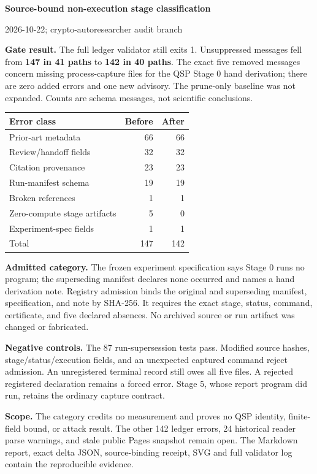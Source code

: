 \documentclass[10pt]{article}
\begin{document}
\begin{center}
{\Large\bfseries Source-bound non-execution stage classification}\par
{\small 2026-10-22; crypto-autoresearcher audit branch}
\end{center}

\textbf{Gate result.} The full ledger validator still exits 1. Unsuppressed
messages fell from \textbf{147 in 41 paths} to \textbf{142 in 40 paths}.
The exact five removed messages concern missing process-capture files for the
QSP Stage 0 hand derivation; there are zero added errors and one new advisory.
The prune-only baseline was not expanded. Counts are schema messages, not
scientific conclusions.

\begin{center}
\begin{tabular}{>{\raggedright\arraybackslash}p{3.2in}rr}
\hline
Error class & Before & After \\
\hline
Prior-art metadata & 66 & 66 \\
Review/handoff fields & 32 & 32 \\
Citation provenance & 23 & 23 \\
Run-manifest schema & 19 & 19 \\
Broken references & 1 & 1 \\
Zero-compute stage artifacts & 5 & 0 \\
Experiment-spec fields & 1 & 1 \\
\hline
Total & 147 & 142 \\
\hline
\end{tabular}
\end{center}

\textbf{Admitted category.} The frozen experiment specification says Stage 0
runs no program; the superseding manifest declares none occurred and names a
hand derivation note. Registry admission binds the original and superseding
manifest, specification, and note by SHA-256. It requires the exact stage,
status, command, certificate, and five declared absences. No archived source
or run artifact was changed or fabricated.

\textbf{Negative controls.} The 87 run-supersession tests pass. Modified
source hashes, stage/status/execution fields, and an unexpected captured
command reject admission. An unregistered terminal record still owes all
five files. A rejected registered declaration remains a forced error. Stage 5,
whose report program did run, retains the ordinary capture contract.

\textbf{Scope.} The category credits no measurement and proves no QSP
identity, finite-field bound, or attack result. The other 142 ledger errors,
24 historical reader parse warnings, and stale public Pages snapshot remain
open. The Markdown report, exact delta JSON, source-binding receipt, SVG and
full validator log contain the reproducible evidence.
\end{document}
